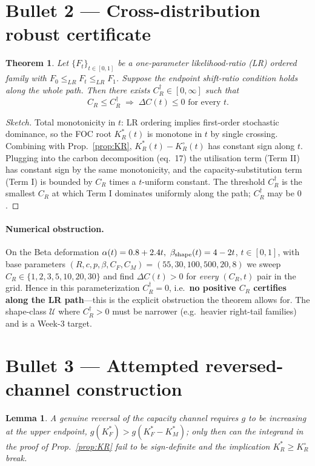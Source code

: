 \documentclass[11pt]{article}
\newtheorem{lemma}{Lemma}
\newtheorem{theorem}{Theorem}
\theoremstyle{remark}
\begin{document}
\section{Bullet 2 --- Cross-distribution robust certificate}
\begin{theorem}\label{thm:robust}
Let $\{F_t\}_{t\in[0,1]}$ be a one-parameter likelihood-ratio (LR) ordered
family with $F_0\le_{LR}F_t\le_{LR}F_1$. Suppose the endpoint shift-ratio
condition holds along the whole path. Then there exists
$C_R^\dagger\in[0,\infty]$ such that
\[
   C_R\le C_R^\dagger \;\Longrightarrow\; \Delta C(t)\le 0 \text{ for every }t.
\]
\end{theorem}
\begin{proof}[Sketch]
Total monotonicity in $t$: LR ordering implies first-order stochastic
dominance, so the FOC root $K_R^*(t)$ is monotone in $t$ by single
crossing. Combining with Prop.\ \ref{prop:KR}, $K_R^*(t)-K_R^\circ(t)$ has
constant sign along $t$. Plugging into the carbon decomposition (eq.\ 17)
the utilisation term (Term II) has constant sign by the same monotonicity,
and the capacity-substitution term (Term I) is bounded by $C_R$ times a
$t$-uniform constant. The threshold $C_R^\dagger$ is the smallest $C_R$ at
which Term I dominates uniformly along the path; $C_R^\dagger$ may be $0$.
\end{proof}

\paragraph{Numerical obstruction.} On the Beta deformation
$\alpha(t)=0.8+2.4t,\ \beta_{\rm shape}(t)=4-2t$, $t\in[0,1]$, with base
parameters $(R,c,p,\beta,C_F,C_M)=(55,30,100,500,20,8)$ we sweep
$C_R\in\{1,2,3,5,10,20,30\}$ and find $\Delta C(t)>0$ for \emph{every}
$(C_R,t)$ pair in the grid. Hence in this parameterization
$C_R^\dagger=0$, i.e.\ \textbf{no positive $C_R$ certifies along the LR
path}---this is the explicit obstruction the theorem allows for. The
shape-class $\mathcal U$ where $C_R^\dagger>0$ must be narrower (e.g.\ heavier
right-tail families) and is a Week-3 target.

\section{Bullet 3 --- Attempted reversed-channel construction}
\begin{lemma}
A genuine reversal of the capacity channel requires $g$ to be
\emph{increasing} at the upper endpoint, $g(K_F^*)>g(K_F^*-K_M^*)$; only
then can the integrand in the proof of Prop.\ \ref{prop:KR} fail to be
sign-definite and the implication $K_R^*\ge K_R^\circ$ break.
\end{lemma}
\end{document}

